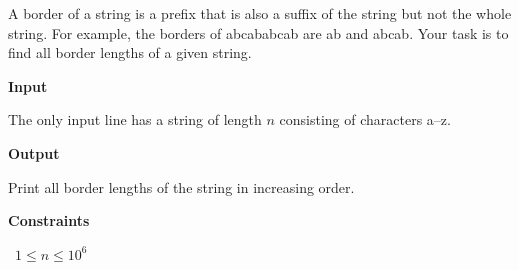 A border of a string is a prefix that is also a suffix of the string but not the whole string. For example, the borders of abcababcab are ab and abcab.
Your task is to find all border lengths of a given string.

\vspace{0.3cm}\noindent\textbf{Input}

The only input line has a string of length $n$ consisting of characters a–z.

\vspace{0.3cm}\noindent\textbf{Output}

Print all border lengths of the string in increasing order.

\vspace{0.3cm}\noindent\textbf{Constraints}

\textbullet\ $1 \le n \le 10^6$